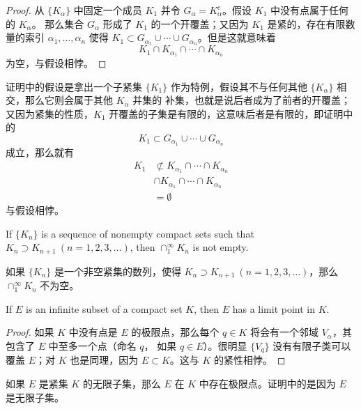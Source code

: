 \documentclass[../poma-notes.tex]{subfiles}
\begin{document}
\begin{proof}
  从 $\{K_{\alpha}\}$ 中固定一个成员 $K_1$ 并令 $G_{\alpha} = K_{\alpha}^c$。假设 $K_1$ 中没有点属于任何的 $K_{\alpha}$。
  那么集合 $G_{\alpha}$ 形成了 $K_1$ 的一个开覆盖；又因为 $K_1$ 是紧的，存在有限数量的索引 $\alpha_1,\dots,\alpha_n$ 使得
  $K_1 \subset G_{\alpha_1} \cup \cdots \cup G_{\alpha_n}$。但是这就意味着
  \[K_1 \cap K_{\alpha_1} \cap \cdots \cap K_{\alpha_n}\]
  为空，与假设相悖。
\end{proof}

\begin{anote}
  证明中的假设是拿出一个子紧集 $\{K_1\}$ 作为特例，假设其不与任何其他 $\{K_{\alpha}\}$ 相交，那么它则会属于其他 ${K_{\alpha}}$ 并集的
  补集，也就是说后者成为了前者的开覆盖；又因为紧集的性质，$K_1$ 开覆盖的子集是有限的，这意味后者是有限的，即证明中的
  \[K_1 \subset G_{\alpha_1} \cup \cdots \cup G_{\alpha_n}\]
  成立，那么就有
  \begin{align*}
    \mathcal{} K_1 & \not\subset K_{\alpha_1} \cap \cdots \cap K_{\alpha_n} \\
                   & \cap K_{\alpha_1} \cap \cdots \cap K_{\alpha_n}        \\
                   & = \emptyset
  \end{align*}
  与假设相悖。
\end{anote}

\begin{corollary}
  If $\{K_n\}$ is a sequence of nonempty compact sets such that $K_n \supset K_{n+1} \ (n=1,2,3,\dots)$, then
  $\cap_1^{\infty} K_n$ is not empty.
\end{corollary}

\anote
如果 $\{K_n\}$ 是一个非空紧集的数列，使得 $K_n \supset K_{n+1} \ (n=1,2,3,\dots)$，那么 $\cap_1^{\infty} K_n$ 不为空。

\begin{theorem}
  If $E$ is an infinite subset of a compact set $K$, then $E$ has a limit point in $K$.
\end{theorem}

\begin{proof}
  如果 $K$ 中没有点是 $E$ 的极限点，那么每个 $q \in K$ 将会有一个邻域 $V_{\alpha}$，其包含了 $E$ 中至多一个点（命名 $q$，
  如果 $q \in E$）。很明显 $\{V_q\}$ 没有有限子类可以覆盖 $E$；对 $K$ 也是同理，因为 $E \subset K$。这与 $K$ 的紧性相悖。
\end{proof}

\anote
如果 $E$ 是紧集 $K$ 的无限子集，那么 $E$ 在 $K$ 中存在极限点。证明中的是因为 $E$
是无限子集。
\end{document}
